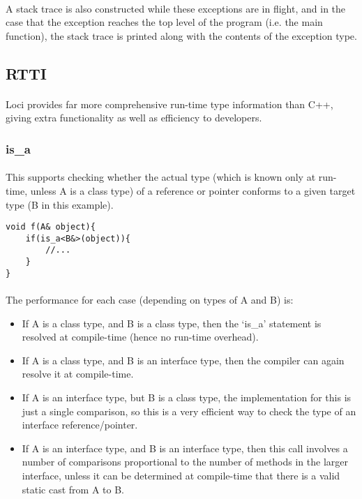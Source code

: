 \documentclass[12pt,twoside,notitlepage]{report}
\begin{document}
\paragraph{}
A stack trace is also constructed while these exceptions are in flight, and in the case that the exception reaches the top level of the program (i.e. the main function), the stack trace is printed along with the contents of the exception type.

\clearpage

\subsection{RTTI}

\paragraph{}
Loci provides far more comprehensive run-time type information than C++, giving extra functionality as well as efficiency to developers.

\subsubsection{is\_a}

\paragraph{}
This supports checking whether the actual type (which is known only at run-time, unless A is a class type) of a reference or pointer conforms to a given target type (B in this example).

\begin{lstlisting}
void f(A& object){
	if(is_a<B&>(object)){
		//...
	}
}
\end{lstlisting}

\paragraph{}
The performance for each case (depending on types of A and B) is:

\begin{itemize}
\item If A is a class type, and B is a class type, then the `is\_a' statement is resolved at compile-time (hence no run-time overhead).
\item If A is a class type, and B is an interface type, then the compiler can again resolve it at compile-time.
\item If A is an interface type, but B is a class type, the implementation for this is just a single comparison, so this is a very efficient way to check the type of an interface reference/pointer.
\item If A is an interface type, and B is an interface type, then this call involves a number of comparisons proportional to the number of methods in the larger interface, unless it can be determined at compile-time that there is a valid static cast from A to B.
\end{itemize}
\end{document}
